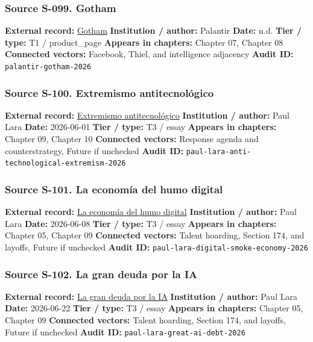 \documentclass[
  american,
  11pt,
  letterpaper,
]{article}
\begin{document}
\subsubsection{Source S-099. Gotham}\label{source-s-099-gotham}

\textbf{External record:}
\href{https://www.palantir.com/platforms/gotham/}{Gotham}
\textbf{Institution / author:} Palantir \textbf{Date:} n.d. \textbf{Tier
/ type:} T1 / product\_page \textbf{Appears in chapters:} Chapter 07,
Chapter 08 \textbf{Connected vectors:} Facebook, Thiel, and intelligence
adjacency \textbf{Audit ID:} \texttt{palantir-gotham-2026}

\subsubsection{Source S-100. Extremismo
antitecnológico}\label{source-s-100-extremismo-antitecnol-gico}

\textbf{External record:}
\href{https://www.dineroenimagen.com/paul-lara/extremismo-antitecnologico/186844}{Extremismo
antitecnológico} \textbf{Institution / author:} Paul Lara \textbf{Date:}
2026-06-01 \textbf{Tier / type:} T3 / essay \textbf{Appears in
chapters:} Chapter 09, Chapter 10 \textbf{Connected vectors:} Response
agenda and counterstrategy, Future if unchecked \textbf{Audit ID:}
\texttt{paul-lara-anti-technological-extremism-2026}

\subsubsection{Source S-101. La economía del humo
digital}\label{source-s-101-la-econom-a-del-humo-digital}

\textbf{External record:}
\href{https://www.dineroenimagen.com/paul-lara/la-economia-del-humo-digital/186875}{La
economía del humo digital} \textbf{Institution / author:} Paul Lara
\textbf{Date:} 2026-06-08 \textbf{Tier / type:} T3 / essay
\textbf{Appears in chapters:} Chapter 05, Chapter 09 \textbf{Connected
vectors:} Talent hoarding, Section 174, and layoffs, Future if unchecked
\textbf{Audit ID:} \texttt{paul-lara-digital-smoke-economy-2026}

\subsubsection{Source S-102. La gran deuda por la
IA}\label{source-s-102-la-gran-deuda-por-la-ia}

\textbf{External record:}
\href{https://www.dineroenimagen.com/paul-lara/la-gran-deuda-por-la-ia/186930}{La
gran deuda por la IA} \textbf{Institution / author:} Paul Lara
\textbf{Date:} 2026-06-22 \textbf{Tier / type:} T3 / essay
\textbf{Appears in chapters:} Chapter 05, Chapter 09 \textbf{Connected
vectors:} Talent hoarding, Section 174, and layoffs, Future if unchecked
\textbf{Audit ID:} \texttt{paul-lara-great-ai-debt-2026}
\end{document}
